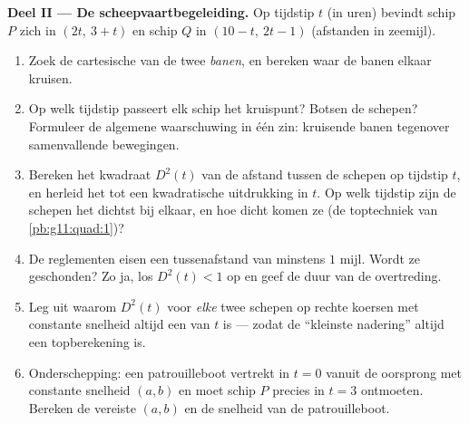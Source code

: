 \begin{problem}
\medskip
\noindent\textbf{Deel II --- De scheepvaartbegeleiding.}
Op tijdstip $t$ (in uren) bevindt schip $P$ zich in $(2t,\ 3 + t)$ en schip
$Q$ in $(10 - t,\ 2t - 1)$ (afstanden in zeemijl).
\begin{enumerate}[resume]
  \item Zoek de cartesische  van de twee \emph{banen}, en
        bereken waar de banen elkaar kruisen.
  \item Op welk tijdstip passeert elk schip het kruispunt? Botsen de schepen?
        Formuleer de algemene waarschuwing in één zin: kruisende banen
        tegenover samenvallende bewegingen.
  \item Bereken het kwadraat $D^2(t)$ van de afstand tussen de schepen op
        tijdstip $t$, en herleid het tot een kwadratische uitdrukking in $t$.
        Op welk tijdstip zijn de schepen het dichtst bij elkaar, en hoe dicht
        komen ze (de toptechniek van \cref{pb:g11:quad:1})?
  \item De reglementen eisen een tussenafstand van minstens $1$ mijl. Wordt
        ze geschonden? Zo ja, los $D^2(t) < 1$ op en geef de duur van de
        overtreding.
  \item Leg uit waarom $D^2(t)$ voor \emph{elke} twee schepen op rechte
        koersen met constante snelheid altijd een  van
        $t$ is --- zodat de ``kleinste nadering'' altijd een topberekening is.
  \item Onderschepping: een patrouilleboot vertrekt in $t = 0$ vanuit de
        oorsprong met constante snelheid $(a, b)$ en moet schip $P$ precies
        in $t = 3$ ontmoeten. Bereken de vereiste $(a, b)$ en de snelheid van
        de patrouilleboot.
\end{enumerate}


\end{problem}
